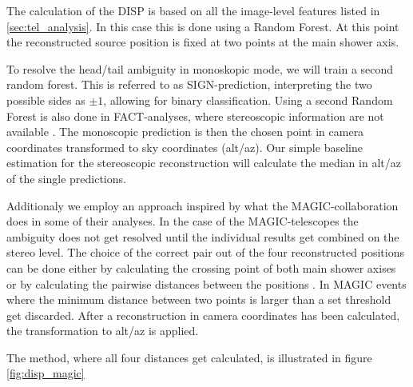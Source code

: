 The calculation of the DISP is based on all the image-level
features listed in \ref{sec:tel_analysis}.
In this case this is done using a Random Forest.
At this point the reconstructed source position
is fixed at two points at the main shower axis.

To resolve the head/tail ambiguity in monoskopic mode,
we will train a second random forest.
This is referred to as SIGN-prediction, interpreting the two possible sides
as $\pm1$, allowing for binary classification.
Using a second Random Forest is also done in FACT-analyses,
where stereoscopic information are not available \cite{fact_sign_performance}.
The monoscopic prediction is then the chosen point in camera coordinates transformed
to sky coordinates (alt/az).
Our simple baseline estimation for the stereoscopic reconstruction will 
calculate the median in alt/az of the single predictions.

Additionaly we employ an approach inspired by 
what the MAGIC-collaboration does in some of their analyses.
In the case of the MAGIC-telescopes the ambiguity does not
get resolved until the individual results get combined
on the stereo level. The choice of the correct
pair out of the four reconstructed positions can be done either
by calculating the crossing point of both main shower axises
or by calculating the pairwise distances between the positions \cite{ALEKSIC201676}.
In MAGIC events where the minimum distance between two points is larger than a set threshold
get discarded.
After a reconstruction in camera coordinates has been calculated,
the transformation to alt/az is applied.

The method, where all four distances get calculated, is illustrated in figure \ref{fig:disp_magic}


